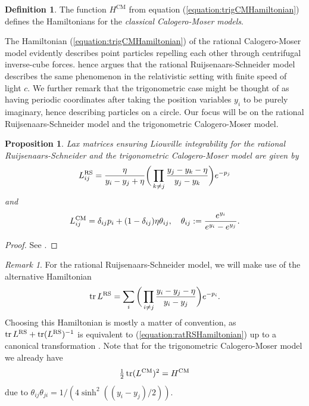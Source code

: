 \documentclass[11pt]{report}
\newtheorem{prop}[theorem]{Proposition}
\theoremstyle{definition}
\newtheorem{definition}[theorem]{Definition}
\theoremstyle{remark}
\newtheorem*{remark}{Remark}
\theoremstyle{remark}
\begin{document}
\begin{definition}
The function $H^\text{CM}$ from equation (\ref{equation:trigCMHamiltonian}) defines the Hamiltonians for the \emph{classical Calogero-Moser models}.
\end{definition}

The Hamiltonian (\ref{equation:trigCMHamiltonian}) of the rational Calogero-Moser model evidently describes point particles repelling each other through centrifugal inverse-cube forces. \cite{article:ruijsenaars:1987} hence argues that the rational Ruijsenaars-Schneider model describes the same phenomenon in the relativistic setting with finite speed of light $c$. We further remark that the trigonometric case might be thought of as having periodic coordinates after taking the position variables $y_i$ to be purely imaginary, hence describing particles on a circle. Our focus will be on the rational Ruijsenaars-Schneider model and the trigonometric Calogero-Moser model.

\begin{prop}
Lax matrices ensuring Liouville integrability for the rational Ruijsenaars-Schneider and the trigonometric Calogero-Moser model are given by
\begin{equation}\label{equation:RSLaxMatrix}
L_{ij}^\textnormal{RS} = \frac{\eta}{y_i-y_j+\eta} \bigg( \prod_{k \neq j} \frac{y_j-y_k-\eta}{y_j-y_k} \bigg) e^{-p_j}
\end{equation}
and
\begin{equation*}
L_{ij}^\textnormal{CM} = \delta_{ij} p_i + (1-\delta_{ij}) \eta \theta_{ij}, \quad \theta_{ij} := \frac{e^{y_i}}{e^{y_i}-e^{y_j}}.
\end{equation*}
\end{prop}

\begin{proof}
See \cite{book:arutyunov:elements}.
\end{proof}

\begin{remark}
For the rational Ruijsenaars-Schneider model, we will make use of the alternative Hamiltonian
\begin{equation}\label{equation:ratRSHamiltonianPrime}
\operatorname{tr} L^\textnormal{RS} = \sum_i \bigg( \prod_{i \neq j} \frac{y_i-y_j-\eta}{y_i-y_j} \bigg) e^{-p_i}.
\end{equation}
Choosing this Hamiltonian is mostly a matter of convention, as $\operatorname{tr} L^\textnormal{RS} + \operatorname{tr}(L^\textnormal{RS})^{-1}$ is equivalent to (\ref{equation:ratRSHamiltonian}) up to a canonical transformation \cite{book:arutyunov:elements}. Note that for the trigonometric Calogero-Moser model we already have
\begin{equation*}
\tfrac{1}{2} \operatorname{tr} (L^\textnormal{CM})^2 = H^\textnormal{CM}
\end{equation*}
due to $\theta_{ij} \theta_{ji} = 1/(4 \sinh^2((y_i-y_j)/2))$.
\end{remark}
\end{document}
